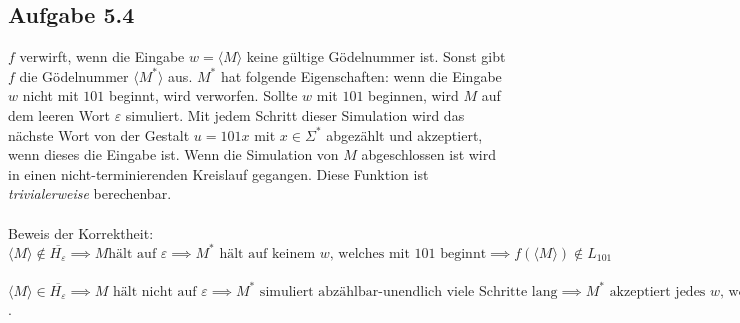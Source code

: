 \documentclass[a4paper,graphics,11pt]{article}
\newcommand\aufgabe[1]{\subsection*{Aufgabe #1}}
\begin{document}
\aufgabe{5.4}
$f$ verwirft, wenn die Eingabe $w = \langle M \rangle$ keine gültige Gödelnummer ist. Sonst gibt $f$ die Gödelnummer $\langle M^* \rangle$ aus. $M^*$ hat folgende Eigenschaften: wenn die Eingabe $w$ nicht mit $101$ beginnt, wird verworfen. Sollte $w$ mit $101$ beginnen, wird $M$ auf dem leeren Wort $\varepsilon$ simuliert. Mit jedem Schritt dieser Simulation wird das nächste Wort von der Gestalt $u = 101x$ mit $x \in \Sigma^*$ abgezählt und akzeptiert, wenn dieses die Eingabe ist. Wenn die Simulation von $M$ abgeschlossen ist wird in einen nicht-terminierenden Kreislauf gegangen. Diese Funktion ist \textit{trivialerweise} berechenbar.\\ \ \\
Beweis der Korrektheit:\\
$\langle M \rangle \notin \overline{H_{\varepsilon}} \implies M \text{hält auf } \varepsilon \implies M^*  \text{ hält auf keinem $w$, welches mit 101 beginnt} \implies f(\langle M \rangle) \notin L_{101}$\\ \ \\
$\langle M \rangle \in \overline{H_{\varepsilon}} \implies \text{$M$ hält nicht auf $\varepsilon$} \implies M^*  \text{ simuliert abzählbar-unendlich viele Schritte lang} \implies M^*  \text{ akzeptiert jedes $w$, welches mit 101 beginnt. Insbesondere hält $M^*$ dann.} \implies f(\langle M \rangle) \in L_{101}$.
\end{document}
